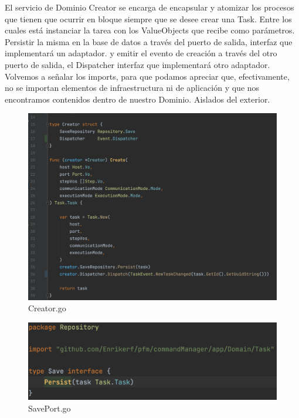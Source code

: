 El servicio de Dominio Creator se encarga de encapsular y atomizar los procesos que tienen que ocurrir en bloque siempre que se desee crear una Task. Entre los cuales está instanciar la tarea con los ValueObjects que recibe como parámetros. Persistir la misma en la base de datos a través del puerto de salida, interfaz que implementará un adaptador. y emitir el evento de creación a través del otro puerto de salida, el Dispatcher interfaz que implementará otro adaptador. Volvemos a señalar los imports, para que podamos apreciar que, efectivamente, no se importan elementos de infraestructura ni de aplicación y que nos encontramos contenidos dentro de nuestro Dominio. Aislados del exterior.

\begin{figure}[H]
    \centering
    \includegraphics[height=0.4\textheight]{./part/Ejecucion/Seguimiento/CreateTaskUseCase/img/PFM - creator}
    \caption{Creator.go}\label{fig:Creator}
\end{figure}

\begin{figure}[H]
    \centering
    \includegraphics[height=0.2\textheight]{./part/Ejecucion/Seguimiento/CreateTaskUseCase/img/PFM - SavePort}
    \caption{SavePort.go}\label{fig:SavePort}
\end{figure}

